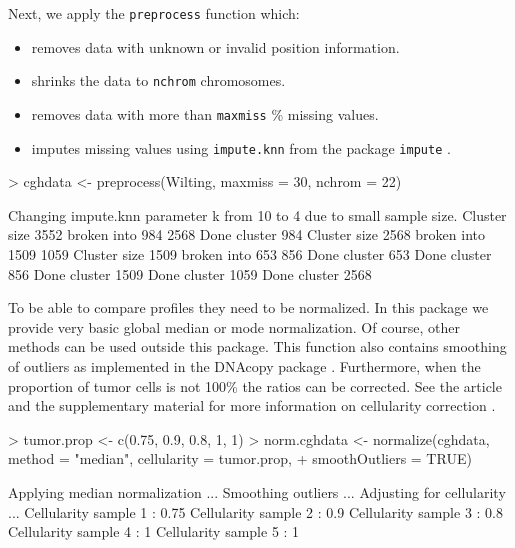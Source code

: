 \documentclass[11pt]{article}
\begin{document}
\noindent
Next, we apply the {\tt preprocess} function which:
\begin{itemize}
\item removes data with unknown or invalid position information.
\item shrinks the data to {\tt nchrom} chromosomes.
\item removes data with more than {\tt maxmiss} \% missing values.
\item imputes missing values using {\tt impute.knn} from the package {\tt impute} \citep{Impute}.
\end{itemize}

\begin{Schunk}
\begin{Sinput}
> cghdata <- preprocess(Wilting, maxmiss = 30, nchrom = 22)
\end{Sinput}
\begin{Soutput}
Changing impute.knn parameter k from 10 to 4 due to small sample size.
Cluster size 3552 broken into 984 2568 
Done cluster 984 
Cluster size 2568 broken into 1509 1059 
Cluster size 1509 broken into 653 856 
Done cluster 653 
Done cluster 856 
Done cluster 1509 
Done cluster 1059 
Done cluster 2568 
\end{Soutput}
\end{Schunk}

To be able to compare profiles they need to be normalized. In this package we provide very basic global median or mode normalization. Of course, other methods can be used outside this package. This function also contains smoothing of outliers as implemented in the DNAcopy package \citep{DNAcopy}. Furthermore, when the proportion of tumor cells is not 100\% the ratios can be corrected. See the article and the supplementary material for more information on cellularity correction \citep{CGHcall}.

\begin{Schunk}
\begin{Sinput}
> tumor.prop <- c(0.75, 0.9, 0.8, 1, 1)
> norm.cghdata <- normalize(cghdata, method = "median", cellularity = tumor.prop, 
+     smoothOutliers = TRUE)
\end{Sinput}
\begin{Soutput}
Applying median normalization ... 
Smoothing outliers ... 
Adjusting for cellularity ... 
Cellularity sample 1 :  0.75 
Cellularity sample 2 :  0.9 
Cellularity sample 3 :  0.8 
Cellularity sample 4 :  1 
Cellularity sample 5 :  1 
\end{Soutput}
\end{Schunk}
\end{document}
